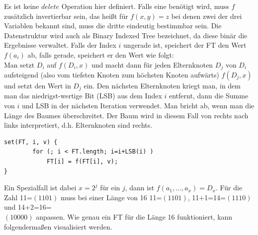 Es ist keine $delete$ Operation hier definiert. Falls eine benötigt wird, muss $f$ zusätzlich invertierbar sein, das heißt für $f(x,y)=z$ bei denen zwei der drei Variablen bekannt sind, muss die dritte eindeutig bestimmbar sein. Die Datenstruktur wird auch als Binary Indexed Tree bezeichnet, da diese binär die Ergebnisse verwaltet. Falls der Index $i$ ungerade ist, speichert der FT den Wert $f(a_i)$ ab, falls gerade, speichert er den Wert wie folgt:\\
Man setzt $D_i$ auf $f(D_i,x)$ und macht dann für jeden Elternknoten $D_j$ von $D_i$ aufsteigend (also vom tiefsten Knoten zum höchsten Knoten aufwärts) $f(D_j,x)$ und setzt den Wert in $D_j$ ein. Den nächsten Elternknoten kriegt man, in dem man das niedrigst-wertige Bit (LSB) aus dem Index $i$ entfernt, dann die Summe von $i$ und LSB in der nächsten Iteration verwendet. Man bricht ab, wenn man die Länge des Baumes überschreitet. Der Baum wird in diesem Fall von rechts nach links interpretiert, d.h. Elternknoten sind rechts.
\begin{lstlisting}
set(FT, i, v) {
        for (; i < FT.length; i=i+LSB(i) )
            FT[i] = f(FT[i], v);
}
\end{lstlisting}
Ein Spezialfall ist dabei $x=2^j$ für ein $j$, dann ist $f(a_1,\dots,a_x)=D_x$. Für die Zahl 11=$(1101)$ muss bei einer Länge von 16 11=$(1101)$, 11+1=14=$(1110)$ und 14+2=16=\\$(10000)$ anpassen. Wie genau ein FT für die Länge 16 funktioniert, kann folgendermaßen visualisiert werden.

